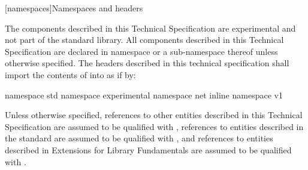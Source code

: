 
[namespaces]{Namespaces and headers}

\pnum
The components described in this Technical Specification are experimental and not part of the \Cpp standard library. All components described in this Technical Specification are declared in namespace  or a sub-namespace thereof unless otherwise specified. The headers described in this technical specification shall import the contents of  into  as if by:

\begin{codeblock}
namespace std {
  namespace experimental {
    namespace net {
      inline namespace v1 {}
    }
  }
}
\end{codeblock}

\pnum
Unless otherwise specified, references to other entities described in this Technical Specification are assumed to be qualified with , references to entities described in the \Cpp standard are assumed to be qualified with , and references to entities described in \Cpp Extensions for Library Fundamentals are assumed to be qualified with .



